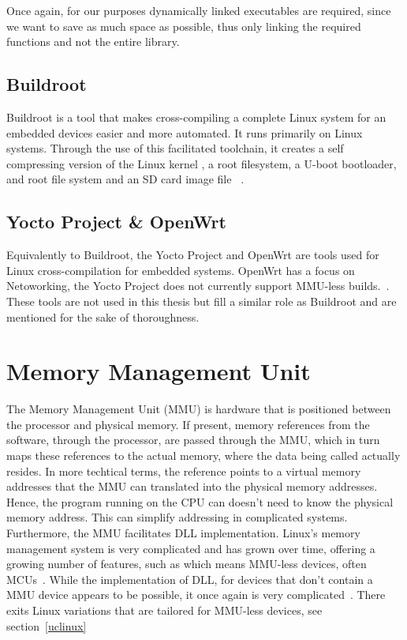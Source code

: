 Once again, for our purposes dynamically linked executables are required, since we want to save as much space as possible, thus only linking the required functions and not the entire library. 
%

\subsection{Buildroot }\label{buildroot.ch}
Buildroot is a tool that makes cross-compiling a complete Linux system for an embedded devices easier and more automated. It runs primarily on Linux systems. Through the use of this facilitated toolchain, it creates a self compressing version of the Linux kernel , a root filesystem, a U-boot bootloader, and root file system and an SD card image file ~\cite {buildroot}.

\subsection{Yocto Project \& OpenWrt}
Equivalently to Buildroot, the Yocto Project and OpenWrt are tools used for Linux cross-compilation for embedded systems. OpenWrt has a focus on Netoworking, the Yocto Project does not currently support MMU-less builds.~\cite{openwrt, yocto}. These tools are not used in this thesis but fill a similar role as Buildroot and are mentioned for the sake of thoroughness. 

\section{Memory Management Unit}\label{mmu.ch}
The Memory Management Unit (MMU) is hardware that is positioned between the processor and physical memory. If present, memory references from the software, through the processor, are passed through the MMU, which in turn maps these references to the actual memory, where the data being called actually resides. In more techtical terms, the reference points to a virtual memory addresses that the MMU can translated into the physical memory addresses. Hence, the program running on the CPU can doesn't need to know the physical memory address. This can simplify addressing in complicated systems. Furthermore, the MMU facilitates DLL implementation. Linux's memory management system is very complicated and has grown over time, offering a growing number of features, such as  which means MMU-less devices, often MCUs~\cite{linuxMMU1, linuxMMU2}. While the implementation of DLL, for devices that don't contain a MMU device appears to be possible, it once again is very complicated~\cite{sharedLibnoMMU}. There exits Linux variations that are tailored for MMU-less devices, see section~\ref{uclinux}

